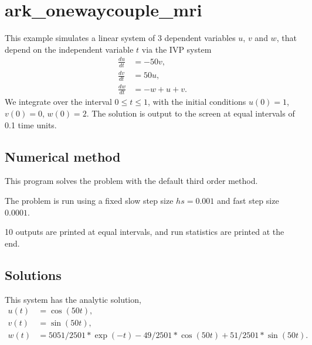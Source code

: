 \documentclass[letterpaper,10pt,english]{sphinxmanual}
\begin{document}
\section{ark\_onewaycouple\_mri}
\label{\detokenize{c_serial:id33}}\label{\detokenize{c_serial:ark-onewaycouple-mri}}
This example simulates a linear system of 3 dependent variables \(u\),
\(v\) and \(w\), that depend on the independent variable \(t\) via
the IVP system
\begin{equation*}
\begin{split}\frac{du}{dt} &= -50 v, \\
\frac{dv}{dt} &= 50 u, \\
\frac{dw}{dt} &= -w + u + v.\end{split}
\end{equation*}
We integrate over the interval \(0 \le t \le 1\), with the initial
conditions \(u(0) = 1\), \(v(0) = 0\), \(w(0)= 2\).  The
solution is output to the screen at equal intervals of 0.1 time units.


\subsection{Numerical method}
\label{\detokenize{c_serial:id34}}
This program solves the problem with the default third order method.

The problem is run using a fixed slow step size \(hs=0.001\) and fast step
size \(0.0001\).

10 outputs are printed at equal intervals, and run statistics
are printed at the end.


\subsection{Solutions}
\label{\detokenize{c_serial:id35}}
This system has the analytic solution,
\begin{equation*}
\begin{split}u(t) &= \cos(50t), \\
v(t) &= \sin(50t), \\
w(t) &= 5051/2501*\exp(-t) - 49/2501*\cos(50t) + 51/2501*\sin(50t).\end{split}
\end{equation*}
\end{document}
